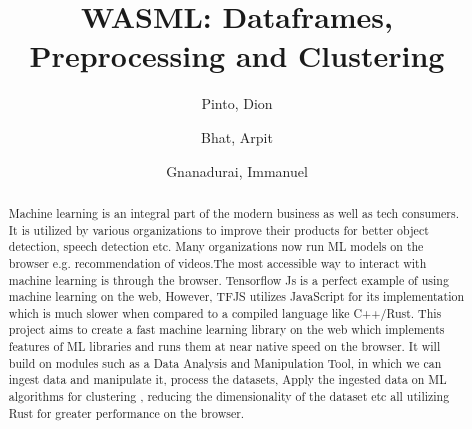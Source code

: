 \documentclass[a4paper,12pt]{report}
\title{WASML: Dataframes, Preprocessing and Clustering}
\author{
  Pinto, Dion\\
  \and
  Bhat, Arpit\\
  \and
  Gnanadurai, Immanuel\\
}
\begin{document}
\maketitle
\tableofcontents

\begin{abstract}
  Machine learning is an integral part of the modern business as well as
  tech consumers. It is utilized by various organizations to improve their
  products for better object detection, speech detection etc. Many
  organizations now run ML models on the browser e.g. recommendation of
  videos.The most accessible way to interact with machine learning is
  through the browser. Tensorflow Js is a perfect example of using machine
  learning on the web, However, TFJS utilizes JavaScript for its
  implementation which is much slower when compared to a compiled language
  like C++/Rust.
  This project aims to create a fast machine learning library on the web
  which implements features of ML libraries and runs them at near native
  speed on the browser. It will build on modules such as a Data Analysis
  and Manipulation Tool, in which we can ingest data and manipulate it,
  process the datasets, Apply the ingested data on ML algorithms for
  clustering , reducing the dimensionality of the dataset etc all utilizing
  Rust for greater performance on the browser.
\end{abstract}
\end{document}
